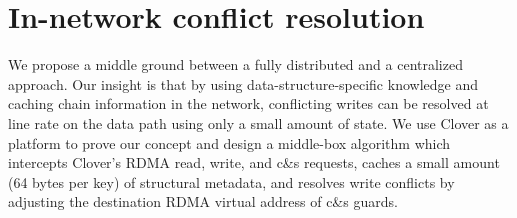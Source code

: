

\section{In-network conflict resolution}

We propose a middle ground between a fully distributed and a centralized
approach. Our insight is that by using data-structure-specific knowledge and
caching chain information in the network, conflicting writes can be resolved
at line rate on the data path using only a small amount of state. We use
Clover as a platform to prove our concept and design a middle-box algorithm
which intercepts Clover's RDMA read, write, and c\&s requests, caches a small
amount (64 bytes per key) of structural metadata, and resolves write
conflicts by adjusting the destination RDMA virtual address of c\&s guards.



